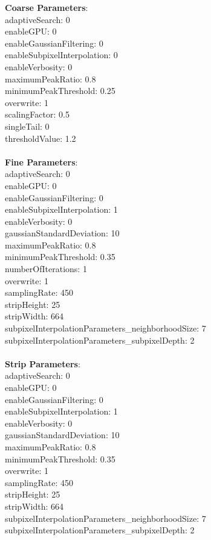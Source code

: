 \documentclass[11pt]{article}
\begin{document}
\textbf{Coarse Parameters}: \\
adaptiveSearch: 0\\
enableGPU: 0\\
enableGaussianFiltering: 0\\
enableSubpixelInterpolation: 0\\
enableVerbosity: 0\\
maximumPeakRatio: 0.8\\
minimumPeakThreshold: 0.25\\
overwrite: 1\\
scalingFactor: 0.5\\
singleTail: 0\\
thresholdValue: 1.2\\
\\
\textbf{Fine Parameters}: \\
adaptiveSearch: 0\\
enableGPU: 0\\
enableGaussianFiltering: 0\\
enableSubpixelInterpolation: 1\\
enableVerbosity: 0\\
gaussianStandardDeviation: 10\\
maximumPeakRatio: 0.8\\
minimumPeakThreshold: 0.35\\
numberOfIterations: 1\\
overwrite: 1\\
samplingRate: 450\\
stripHeight: 25\\
stripWidth: 664\\
subpixelInterpolationParameters\_neighborhoodSize: 7\\
subpixelInterpolationParameters\_subpixelDepth: 2\\
\\
\textbf{Strip Parameters}: \\
adaptiveSearch: 0\\
enableGPU: 0\\
enableGaussianFiltering: 0\\
enableSubpixelInterpolation: 1\\
enableVerbosity: 0\\
gaussianStandardDeviation: 10\\
maximumPeakRatio: 0.8\\
minimumPeakThreshold: 0.35\\
overwrite: 1\\
samplingRate: 450\\
stripHeight: 25\\
stripWidth: 664\\
subpixelInterpolationParameters\_neighborhoodSize: 7\\
subpixelInterpolationParameters\_subpixelDepth: 2\\
\\
\newpage
\end{document}
